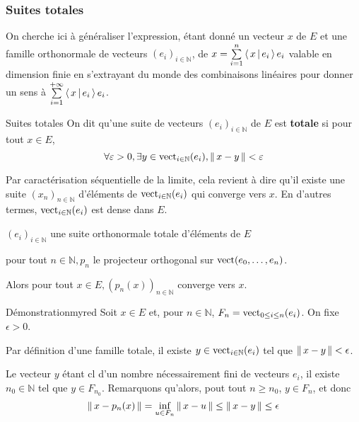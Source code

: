     \subsubsection{Suites totales}

    On cherche ici à généraliser l’expression, étant donné un vecteur $x$ de $E$ et une famille orthonormale de vecteurs $(e_i)_{i \in \mathbb{N}}$, de $x = \sum\limits_{i =1}^n \left<\,x\,\middle|\,e_i\,\right> e_i$ valable en dimension finie en s’extrayant du monde des combinaisons linéaires pour donner un sens à $\sum\limits_{i=1}^{+\infty} \left<\,x\,\middle|\,e_i\,\right> e_i$.

    \begin{defi}{Suites totales}{}
        On dit qu’une suite de vecteurs $(e_i)_{i \in \mathbb{N}}$ de $E$ est \textbf{totale} si pour tout $x \in E$, 
        \[ \forall \varepsilon > 0, \exists y \in \operatorname{vect}_{i \in \mathbb{N}}(e_i), \left\lVert \,x-y \, \right\rVert < \varepsilon \] 
    \end{defi}

    Par caractérisation séquentielle de la limite, cela revient à dire qu’il existe une suite $(x_n)_{n \in \mathbb{N}}$ d’éléments de $\operatorname{vect}_{i \in \mathbb{N}}(e_i)$ qui converge vers $x$. En d’autres termes, $\operatorname{vect}_{i \in \mathbb{N}}(e_i)$ est dense dans $E$.

    \begin{theo}{}{}
        \begin{soient}
            \item $(e_i)_{i \in \mathbb{N}}$ une suite orthonormale totale d’éléments de $E$
            \item pour tout $n \in \mathbb{N}, p_n$ le projecteur orthogonal sur $\operatorname{vect}(e_0, \ldots, e_n)$. 
        \end{soient}
        Alors pour tout $x \in E, (p_n(x))_{n \in \mathbb{N}}$ converge vers $x$.
    \end{theo}

    \begin{demo}{Démonstration}{myred}
        Soit $x \in E$ et, pour $n \in \mathbb{N}$, $F_n = \operatorname{vect}_{0 \leq i \leq n}(e_i)$. On fixe $\epsilon > 0$.

        Par définition d’une famille totale, il existe $y \in \operatorname{vect}_{i \in \mathbb{N}}(e_i)$ tel que $\left\lVert \,x - y \, \right\rVert < \epsilon$.

        Le vecteur $y$ étant cl d’un nombre nécessairement fini de vecteurs $e_i$, il existe $n_0 \in \mathbb{N}$ tel que $y \in F_{n_0}$. Remarquons qu’alors, pout tout $n \geq n_0$, $y \in F_n$, et donc 
        \[ \left\lVert \,x - p_n(x) \, \right\rVert = \inf_{u \in F_n} \left\lVert \,x - u \, \right\rVert \leq \left\lVert \,x - y \, \right\rVert \leq \epsilon \]
    \end{demo}

